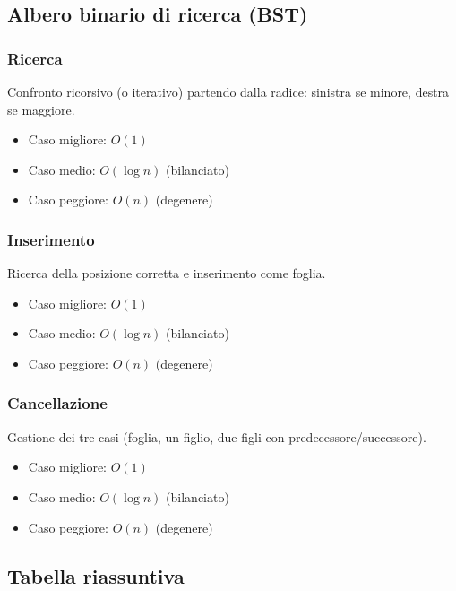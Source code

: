 \documentclass[a4paper,12pt]{article}
\begin{document}
\subsection{Albero binario di ricerca (BST)}

\subsubsection{Ricerca}
Confronto ricorsivo (o iterativo) partendo dalla radice:
sinistra se minore, destra se maggiore.
\begin{itemize}
    \item Caso migliore: $O(1)$
    \item Caso medio: $O(\log n)$ (bilanciato)
    \item Caso peggiore: $O(n)$ (degenere)
\end{itemize}

\subsubsection{Inserimento}
Ricerca della posizione corretta e inserimento come foglia.
\begin{itemize}
    \item Caso migliore: $O(1)$
    \item Caso medio: $O(\log n)$ (bilanciato)
    \item Caso peggiore: $O(n)$ (degenere)
\end{itemize}

\subsubsection{Cancellazione}
Gestione dei tre casi (foglia, un figlio, due figli con predecessore/successore).
\begin{itemize}
    \item Caso migliore: $O(1)$
    \item Caso medio: $O(\log n)$ (bilanciato)
    \item Caso peggiore: $O(n)$ (degenere)
\end{itemize}


\subsection{Tabella riassuntiva}
\end{document}
